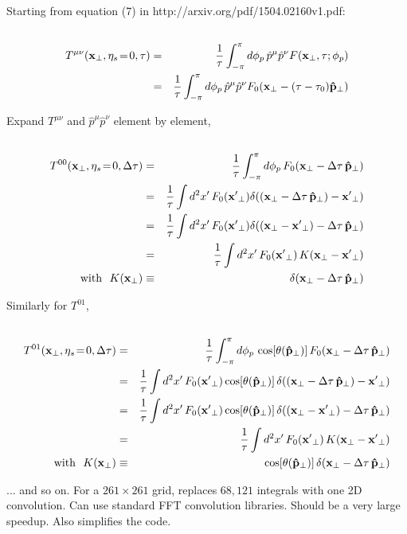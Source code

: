 \documentclass[a4paper,10pt]{article}
\begin{document}
Starting from equation (7) in http://arxiv.org/pdf/1504.02160v1.pdf:
\begin{eqnarray}
 \cr T^{\mu\nu}({\bf x}_\perp, \eta_s\!=\!0, \tau)  &=& \frac{1}{\tau} \int_{-\pi}^\pi d\phi_p\, \hat{p}^\mu \hat{p}^\nu F({\bf x}_\perp, \tau; \phi_p) \nonumber \\
 &=& \frac{1}{\tau} \int_{-\pi}^\pi d\phi_p\, \hat{p}^\mu \hat{p}^\nu F_0({\bf x}_\perp - (\tau - \tau_0){\bf \hat{p}_\perp}) \nonumber
\end{eqnarray}

Expand $T^{\mu\nu}$ and $\hat{p}^\mu \hat{p}^\nu$ element by element,
\begin{eqnarray}
 \cr T^{00}({\bf x}_\perp, \eta_s\!=\!0, \Delta \tau) &=& \frac{1}{\tau} \int_{-\pi}^\pi d\phi_p\, F_0({\bf x}_\perp - \Delta\tau\,{\bf \hat{p}_\perp}) \nonumber \\
     &=& \frac{1}{\tau} \int d^2x'\, F_0({\bf x'}_\perp) \delta(({\bf x}_\perp - \Delta\tau\,{\bf \hat{p}_\perp}) - {\bf x'}_\perp) \nonumber \\
     &=& \frac{1}{\tau} \int d^2x'\, F_0({\bf x'}_\perp) \delta(({\bf x}_\perp - {\bf x'}_\perp) - \Delta\tau\,{\bf \hat{p}_\perp}) \nonumber \\
     &=& \frac{1}{\tau} \int d^2x'\, F_0({\bf x'}_\perp) \, K({\bf x}_\perp - {\bf x'}_\perp) \nonumber \\ 
     \mathrm{with} ~~ K({\bf x}_\perp) &\equiv& \delta({\bf x}_\perp - \Delta\tau\,{\bf \hat{p}_\perp}) \nonumber
\end{eqnarray}

Similarly for $T^{01}$,
\begin{eqnarray}
 \cr T^{01}({\bf x}_\perp, \eta_s\!=\!0, \Delta \tau) &=& \frac{1}{\tau} \int_{-\pi}^\pi d\phi_p\, \cos[\theta({\bf \hat{p}_\perp})]\, F_0({\bf x}_\perp - \Delta\tau\,{\bf \hat{p}_\perp}) \nonumber \\
     &=& \frac{1}{\tau} \int d^2x'\, F_0({\bf x'}_\perp) \cos[\theta({\bf \hat{p}}_\perp)]\, \delta(({\bf x}_\perp - \Delta\tau\,{\bf \hat{p}_\perp}) - {\bf x'}_\perp) \nonumber \\
     &=& \frac{1}{\tau} \int d^2x'\, F_0({\bf x'}_\perp) \cos[\theta({\bf \hat{p}}_\perp)] \, \delta(({\bf x}_\perp - {\bf x'}_\perp) - \Delta\tau\,{\bf \hat{p}_\perp}) \nonumber \\
     &=& \frac{1}{\tau} \int d^2x'\, F_0({\bf x'}_\perp) \, K({\bf x}_\perp - {\bf x'}_\perp) \nonumber \\
     \mathrm{with} ~~ K({\bf x}_\perp) &\equiv& \cos[\theta({\bf \hat{p}}_\perp)] \, \delta({\bf x}_\perp - \Delta\tau\,{\bf \hat{p}_\perp}) \nonumber
\end{eqnarray}

... and so on. For a $261\times261$ grid, replaces $68,121$ integrals with one 2D convolution. Can use standard FFT convolution libraries. Should be a very large speedup. 
Also simplifies the code.
\end{document}
